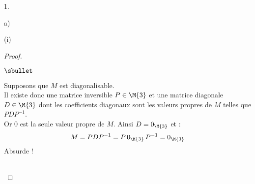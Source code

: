\documentclass[11pt]{article}%
\begin{document}
\begin{noliste}{1.}
\begin{noliste}{a)}
\begin{nonoliste}{(i)}
\begin{proof}
\begin{remarkL}{.98}
\begin{noliste}{$\sbullet$}
          \item Supposons que $M$ est diagonalisable.\\
            Il existe donc une matrice inversible $P \in \M{3}$ et une
            matrice diagonale $D \in \M{3}$ dont les coefficients
            diagonaux sont les valeurs propres de $M$ telles que $%
            PDP^{-1}$.\\
            Or $0$ est la seule valeur propre de $M$. Ainsi $D =
            0_{\M{3}}$ et :
            \[
            M = PDP^{-1} = P \, 0_{\M{3}} \, P^{-1} = 0_{\M{3}}
            \]
            Absurde !
          \end{noliste}
        \end{remarkL}~\\[-1.4cm]
      \end{proof}
    \end{nonoliste}


    \newpage



\end{noliste}
\end{noliste}
\end{document}
